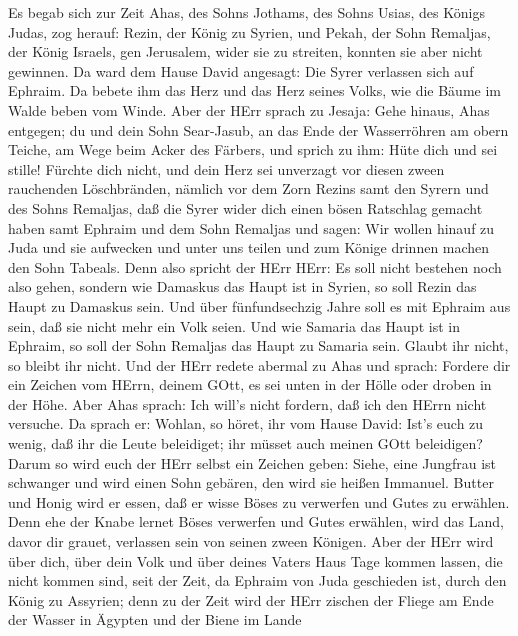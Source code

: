 Es begab sich zur Zeit Ahas, des Sohns Jothams, des Sohns
Usias, des Königs Judas, zog herauf: Rezin, der König zu Syrien, und
Pekah, der Sohn Remaljas, der König Israels, gen Jerusalem, wider sie zu
streiten, konnten sie aber nicht gewinnen.  Da ward dem
Hause David angesagt: Die Syrer verlassen sich auf Ephraim. Da bebete
ihm das Herz und das Herz seines Volks, wie die Bäume im Walde beben vom
Winde.  Aber der HErr sprach zu Jesaja: Gehe hinaus, Ahas
entgegen; du und dein Sohn Sear-Jasub, an das Ende der Wasserröhren am
obern Teiche, am Wege beim Acker des Färbers,  und sprich zu
ihm: Hüte dich und sei stille! Fürchte dich nicht, und dein Herz sei
unverzagt vor diesen zween rauchenden Löschbränden, nämlich vor dem Zorn
Rezins samt den Syrern und des Sohns Remaljas,  daß die
Syrer wider dich einen bösen Ratschlag gemacht haben samt Ephraim und
dem Sohn Remaljas und sagen:  Wir wollen hinauf zu Juda und
sie aufwecken und unter uns teilen und zum Könige drinnen machen den
Sohn Tabeals.  Denn also spricht der HErr HErr: Es soll
nicht bestehen noch also gehen,  sondern wie Damaskus das
Haupt ist in Syrien, so soll Rezin das Haupt zu Damaskus sein. Und über
fünfundsechzig Jahre soll es mit Ephraim aus sein, daß sie nicht mehr
ein Volk seien.  Und wie Samaria das Haupt ist in Ephraim,
so soll der Sohn Remaljas das Haupt zu Samaria sein. Glaubt ihr nicht,
so bleibt ihr nicht.  Und der HErr redete abermal zu Ahas
und sprach:  Fordere dir ein Zeichen vom HErrn, deinem
GOtt, es sei unten in der Hölle oder droben in der Höhe. 
Aber Ahas sprach: Ich will's nicht fordern, daß ich den HErrn nicht
versuche.  Da sprach er: Wohlan, so höret, ihr vom Hause
David: Ist's euch zu wenig, daß ihr die Leute beleidiget; ihr müsset
auch meinen GOtt beleidigen?  Darum so wird euch der HErr
selbst ein Zeichen geben: Siehe, eine Jungfrau ist schwanger und wird
einen Sohn gebären, den wird sie heißen Immanuel.  Butter
und Honig wird er essen, daß er wisse Böses zu verwerfen und Gutes zu
erwählen.  Denn ehe der Knabe lernet Böses verwerfen und
Gutes erwählen, wird das Land, davor dir grauet, verlassen sein von
seinen zween Königen.  Aber der HErr wird über dich, über
dein Volk und über deines Vaters Haus Tage kommen lassen, die nicht
kommen sind, seit der Zeit, da Ephraim von Juda geschieden ist, durch
den König zu Assyrien;  denn zu der Zeit wird der HErr
zischen der Fliege am Ende der Wasser in Ägypten und der Biene im Lande
